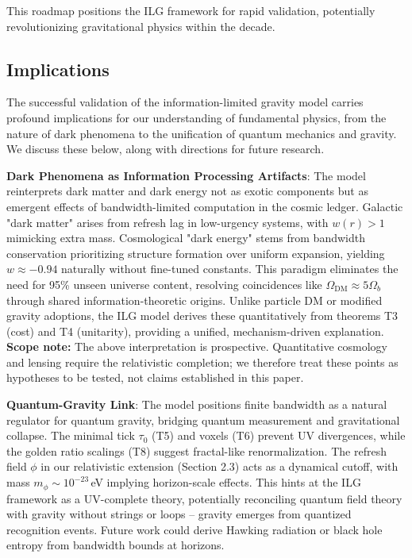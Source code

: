 \documentclass[12pt,a4paper]{article}
\begin{document}
This roadmap positions the ILG framework for rapid validation, potentially revolutionizing gravitational physics within the decade.

\subsection{Implications}

The successful validation of the information-limited gravity model carries profound implications for our understanding of fundamental physics, from the nature of dark phenomena to the unification of quantum mechanics and gravity. We discuss these below, along with directions for future research.

\textbf{Dark Phenomena as Information Processing Artifacts}: The model reinterprets dark matter and dark energy not as exotic components but as emergent effects of bandwidth-limited computation in the cosmic ledger. Galactic "dark matter" arises from refresh lag in low-urgency systems, with $w(r) > 1$ mimicking extra mass. Cosmological "dark energy" stems from bandwidth conservation prioritizing structure formation over uniform expansion, yielding $w \approx -0.94$ naturally without fine-tuned constants. This paradigm eliminates the need for 95\% unseen universe content, resolving coincidences like $\Omega_\mathrm{DM} \approx 5 \Omega_b$ through shared information-theoretic origins. Unlike particle DM or modified gravity adoptions, the ILG model derives these quantitatively from theorems T3 (cost) and T4 (unitarity), providing a unified, mechanism-driven explanation.
\textbf{Scope note:} The above interpretation is prospective. Quantitative cosmology and lensing require the relativistic completion; we therefore treat these points as hypotheses to be tested, not claims established in this paper.

\textbf{Quantum-Gravity Link}: The model positions finite bandwidth as a natural regulator for quantum gravity, bridging quantum measurement and gravitational collapse. The minimal tick $\tau_0$ (T5) and voxels (T6) prevent UV divergences, while the golden ratio scalings (T8) suggest fractal-like renormalization. The refresh field $\phi$ in our relativistic extension (Section 2.3) acts as a dynamical cutoff, with mass $m_\phi \sim 10^{-23}$\,eV implying horizon-scale effects. This hints at the ILG framework as a UV-complete theory, potentially reconciling quantum field theory with gravity without strings or loops -- gravity emerges from quantized recognition events. Future work could derive Hawking radiation or black hole entropy from bandwidth bounds at horizons.
\end{document}
